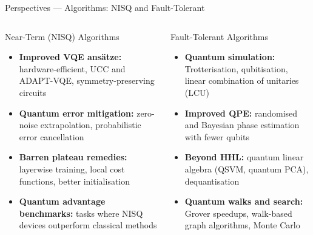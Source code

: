 \documentclass[aspectratio=169,12pt]{beamer}
\begin{document}
\begin{frame}{Perspectives --- Algorithms: NISQ and Fault-Tolerant}
  \begin{columns}[T]
      \begin{block}{Near-Term (NISQ) Algorithms}
        \begin{itemize}\small\itemsep1pt
          \item \textbf{Improved VQE ans\"{a}tze:}
                hardware-efficient, UCC and ADAPT-VQE,
                symmetry-preserving circuits
          \item \textbf{Quantum error mitigation:}
                zero-noise extrapolation,
                probabilistic error cancellation
          \item \textbf{Barren plateau remedies:}
                layerwise training, local cost
                functions, better initialisation
          \item \textbf{Quantum advantage benchmarks:}
                tasks where NISQ devices
                outperform classical methods
        \end{itemize}
      \end{block}
      \begin{block}{Fault-Tolerant Algorithms}
        \begin{itemize}\small\itemsep1pt
          \item \textbf{Quantum simulation:}
                Trotterisation, qubitisation,
                linear combination of unitaries (LCU)
          \item \textbf{Improved QPE:}
                randomised and Bayesian phase
                estimation with fewer qubits
          \item \textbf{Beyond HHL:}
                quantum linear algebra (QSVM,
                quantum PCA), dequantisation
          \item \textbf{Quantum walks and search:}
                Grover speedups, walk-based
                graph algorithms, Monte Carlo
        \end{itemize}
      \end{block}
  \end{columns}
\end{frame}
\end{document}
